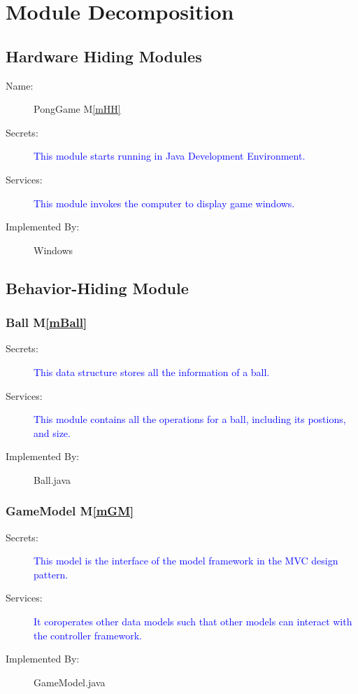 \documentclass[12pt,letterpaper]{article}
\begin{document}
	\section{Module Decomposition} \label{SecMD}
	\subsection{Hardware Hiding Modules}
\begin{description}
	\item[Name: ] PongGame M\ref{mHH}
	\item[Secrets: ] \textcolor{blue}{This module starts running in Java Development Environment.}
	\item[Services: ] \textcolor{blue} {This module invokes the computer to display game windows.}
	\item[Implemented By: ] Windows
\end{description}

	\subsection{Behavior-Hiding Module}
	\subsubsection{Ball M\ref{mBall}}
\begin{description} 
	\item[Secrets: ] \textcolor{blue}{This data structure stores all the information of a ball.}
	\item[Services: ] \textcolor{blue} {This module contains all the operations for a ball, including its postions, and size.}
	\item[Implemented By: ] Ball.java
\end{description}

	\subsubsection{GameModel M\ref{mGM}}
\begin{description} 
	\item[Secrets: ] \textcolor{blue}{This model is the interface of the model framework in the MVC design pattern.}
	\item[Services: ] \textcolor{blue} {It coroperates other data models such that other models can interact with the controller framework.}
	\item[Implemented By: ] GameModel.java
\end{description}
\end{document}
